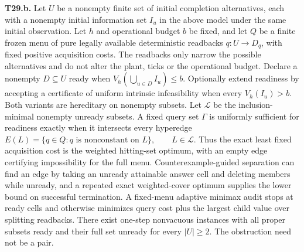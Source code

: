 \begin{theorem}
\textbf{T29.b.} Let \(U\) be a nonempty finite set of initial completion alternatives, each with a nonempty initial information set \(I_u\) in the above model under the same initial observation. Let \(h\) and operational budget \(b\) be fixed, and let \(Q\) be a finite frozen menu of pure legally available deterministic readbacks \(q:U\to D_q\), with fixed positive acquisition costs. The readbacks only narrow the possible alternatives and do not alter the plant, ticks or the operational budget. Declare a nonempty \(D\subseteq U\) ready when \(V_h(\bigcup_{u\in D}I_u)\le b\). Optionally extend readiness by accepting a certificate of uniform intrinsic infeasibility when every \(V_h(I_u)>b\). Both variants are hereditary on nonempty subsets. Let \(\mathcal L\) be the inclusion-minimal nonempty unready subsets. A fixed query set \(\Gamma\) is uniformly sufficient for readiness exactly when it intersects every hyperedge
\(E(L)=\{q\in Q: q\text{ is nonconstant on }L\},\qquad L\in\mathcal L.\)
Thus the exact least fixed acquisition cost is the weighted hitting-set optimum, with an empty edge certifying impossibility for the full menu. Counterexample-guided separation can find an edge by taking an unready attainable answer cell and deleting members while unready, and a repeated exact weighted-cover optimum supplies the lower bound on successful termination. A fixed-menu adaptive minimax audit stops at ready cells and otherwise minimizes query cost plus the largest child value over splitting readbacks. There exist one-step nonvacuous instances with all proper subsets ready and their full set unready for every \(|U|\ge2\). The obstruction need not be a pair.

\end{theorem}

